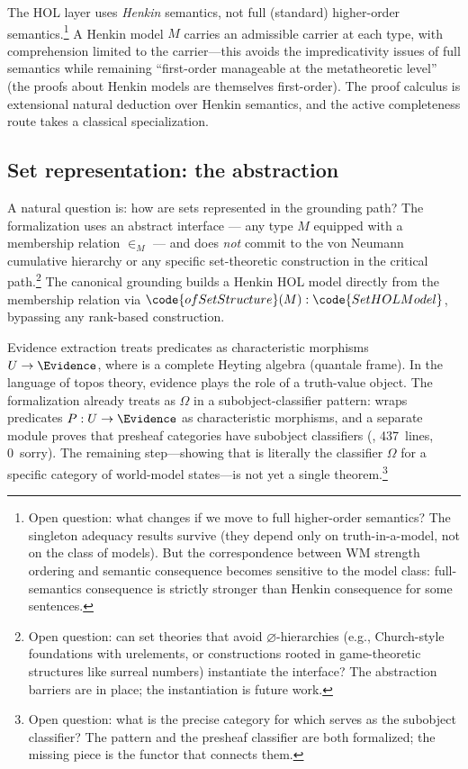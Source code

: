 \documentclass[11pt,openany]{report}
\begin{document}
The HOL layer uses \emph{Henkin} semantics, not full (standard)
higher-order semantics.\footnote{Open question: what changes if we
move to full higher-order semantics?  The singleton adequacy results
survive (they depend only on truth-in-a-model, not on the class of
models).  But the correspondence between WM strength ordering and
semantic consequence becomes sensitive to the model class:
full-semantics consequence is strictly stronger than Henkin
consequence for some sentences.}  A Henkin model $M$ carries an
admissible carrier at each type, with comprehension limited to the
carrier---this avoids the impredicativity issues of full semantics
while remaining ``first-order manageable at the metatheoretic level''
(the proofs about Henkin models are themselves first-order).  The
proof calculus is extensional natural deduction over Henkin semantics, and
the active completeness route takes a classical specialization.

\subsection{Set representation: the  abstraction}

A natural question is: how are sets represented in the grounding
path?  The formalization uses an abstract  interface
--- any type $M$ equipped with a membership relation $\in_M$ ---
and does \emph{not} commit to the von Neumann cumulative hierarchy
or any specific set-theoretic construction in the critical
path.\footnote{Open question: can set theories that avoid
$\varnothing$-hierarchies (e.g., Church-style foundations with
urelements, or constructions rooted in game-theoretic structures
like surreal numbers) instantiate the  interface?
The abstraction barriers are in place; the instantiation is future
work.}  The canonical grounding builds a Henkin HOL model directly
from the membership relation via
$\code{ofSetStructure}(M) : \code{SetHOLModel}$,
bypassing any rank-based construction.

Evidence extraction treats predicates as characteristic morphisms
$U \to \Evidence$, where \Evidence{} is a complete Heyting algebra
(quantale frame).  In the language of topos theory, evidence plays
the role of a truth-value
object.  The formalization already treats \Evidence{} as
$\Omega$ in a subobject-classifier pattern: 
wraps predicates $P : U \to \Evidence$ as characteristic morphisms,
and a separate module proves that presheaf categories have subobject
classifiers (, 437~lines,
0~sorry).  The remaining step---showing that \Evidence{} is literally
the classifier $\Omega$ for a specific category of world-model
states---is not yet a single
theorem.\footnote{Open question: what is the precise category for
which \Evidence{} serves as the subobject classifier?  The
 pattern and the presheaf classifier are
both formalized; the missing piece is the functor that connects
them.}
\end{document}

